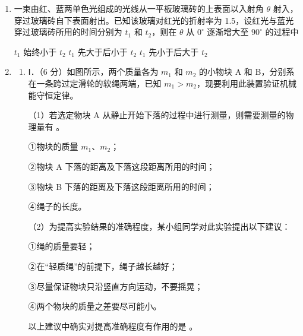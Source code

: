 \documentclass[\gkver]{gaokaozhenti}
\begin{document}
\begin{enumerate}
\item
一束由红、蓝两单色光组成的光线从一平板玻璃砖的上表面以入射角 $\theta$ 射入，穿过玻璃砖自下表面射出。已知该玻璃对红光的折射率为 1.5，设红光与蓝光穿过玻璃砖所用的时间分别为 $t_{1}$ 和 $t_{2}$，则在 $\theta$ 从 $0^{\circ}$ 逐渐增大至 $90^{\circ}$ 的过程中

{$t_{1}$ 始终小于 $t_{2}$}
{$t_{1}$ 先大于后小于 $t_{2}$}
{$t_{1}$ 先小于后大于 $t_{2}$}


\item
\begin{enumerate}
	\item
	Ⅰ．（6 分）如图所示，两个质量各为 $m_{1}$ 和 $m_{2}$ 的小物块 A 和 B，分别系在一条跨过定滑轮的软绳两端，已知 $m_{1}>m_{2}$，现要利用此装置验证机械能守恒定律。

	（1）若选定物块 A 从静止开始下落的过程中进行测量，则需要测量的物理量有 \tkanswer[2.5cm]{}。

	①物块的质量 $m_{1}$、$m_{2}$；

	②物块 A 下落的距离及下落这段距离所用的时间；

	③物块 B 下落的距离及下落这段距离所用的时间；

	④绳子的长度。

	（2）为提高实验结果的准确程度，某小组同学对此实验提出以下建议：

	①绳的质量要轻；

	②在“轻质绳”的前提下，绳子越长越好；

	③尽量保证物块只沿竖直方向运动，不要摇晃；

	④两个物块的质量之差要尽可能小。

	以上建议中确实对提高准确程度有作用的是 \tkanswer[2.5cm]{}。


\end{enumerate}
\end{enumerate}
\end{document}
